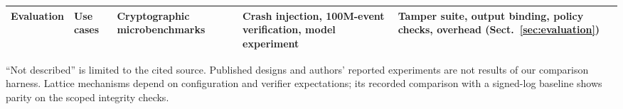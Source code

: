 \begin{table}[!htbp]
\begin{tabularx}{\textwidth}{@{}>{\raggedright\arraybackslash}p{29mm}>{\raggedright\arraybackslash}X>{\raggedright\arraybackslash}X>{\raggedright\arraybackslash}X>{\raggedright\arraybackslash}X@{}}
Evaluation & Use cases & Cryptographic microbenchmarks & Crash injection, 100M-event verification, model experiment & Tamper suite, output binding, policy checks, overhead (Sect.~\ref{sec:evaluation}) \\
\bottomrule
\end{tabularx}
\par\smallskip\noindent\begin{minipage}{\textwidth}
``Not described'' is limited to the cited source. Published designs and authors' reported experiments are not results of our comparison harness. Lattice mechanisms depend on configuration and verifier expectations; its recorded comparison with a signed-log baseline shows parity on the scoped integrity checks.
\end{minipage}
\endgroup
\end{table}
